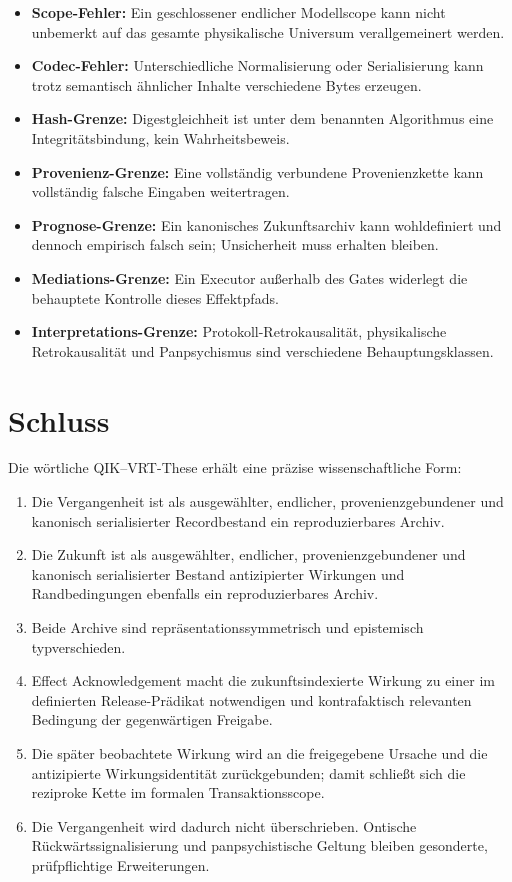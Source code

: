\documentclass[11pt,a4paper]{article}
\theoremstyle{remark}
\begin{document}
\begin{itemize}
  \item \textbf{Scope-Fehler:} Ein geschlossener endlicher Modellscope kann
  nicht unbemerkt auf das gesamte physikalische Universum verallgemeinert
  werden.
  \item \textbf{Codec-Fehler:} Unterschiedliche Normalisierung oder
  Serialisierung kann trotz semantisch ähnlicher Inhalte verschiedene Bytes
  erzeugen.
  \item \textbf{Hash-Grenze:} Digestgleichheit ist unter dem benannten
  Algorithmus eine Integritätsbindung, kein Wahrheitsbeweis.
  \item \textbf{Provenienz-Grenze:} Eine vollständig verbundene
  Provenienzkette kann vollständig falsche Eingaben weitertragen.
  \item \textbf{Prognose-Grenze:} Ein kanonisches Zukunftsarchiv kann
  wohldefiniert und dennoch empirisch falsch sein; Unsicherheit muss erhalten
  bleiben.
  \item \textbf{Mediations-Grenze:} Ein Executor außerhalb des Gates
  widerlegt die behauptete Kontrolle dieses Effektpfads.
  \item \textbf{Interpretations-Grenze:} Protokoll-Retrokausalität,
  physikalische Retrokausalität und Panpsychismus sind verschiedene
  Behauptungsklassen.
\end{itemize}

\section{Schluss}

Die wörtliche QIK--VRT-These erhält eine präzise wissenschaftliche Form:

\begin{enumerate}
  \item Die Vergangenheit ist als ausgewählter, endlicher,
  provenienzgebundener und kanonisch serialisierter Recordbestand ein
  reproduzierbares Archiv.
  \item Die Zukunft ist als ausgewählter, endlicher,
  provenienzgebundener und kanonisch serialisierter Bestand antizipierter
  Wirkungen und Randbedingungen ebenfalls ein reproduzierbares Archiv.
  \item Beide Archive sind repräsentationssymmetrisch und epistemisch
  typverschieden.
  \item Effect Acknowledgement macht die zukunftsindexierte Wirkung zu einer
  im definierten Release-Prädikat notwendigen und kontrafaktisch relevanten
  Bedingung der gegenwärtigen Freigabe.
  \item Die später beobachtete Wirkung wird an die freigegebene Ursache
  und die antizipierte Wirkungsidentität zurückgebunden; damit schließt sich
  die reziproke Kette im formalen Transaktionsscope.
  \item Die Vergangenheit wird dadurch nicht überschrieben. Ontische
  Rückwärtssignalisierung und panpsychistische Geltung bleiben gesonderte,
  prüfpflichtige Erweiterungen.
\end{enumerate}
\end{document}
